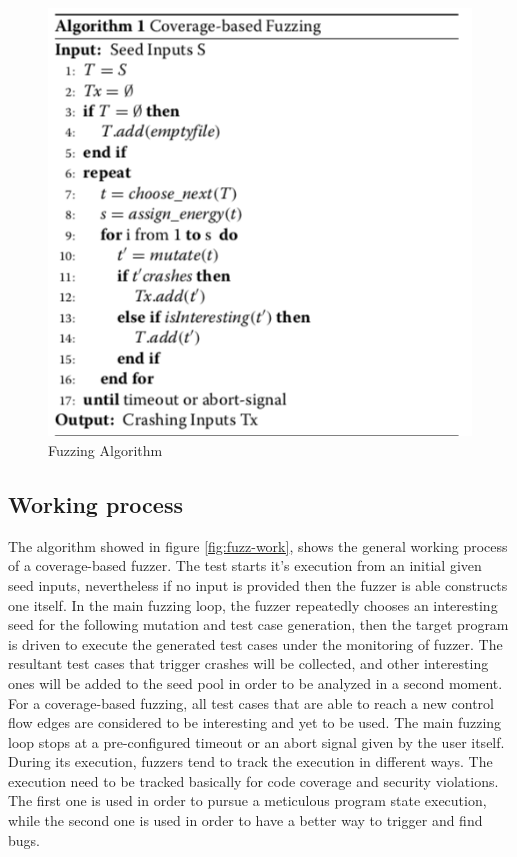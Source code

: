 \begin{figure}[tbh]
  \centering
  \includegraphics[width=0.7\linewidth]{images/Algo-fuzz.png}
  \caption[Fuzzing Algorithm]{Fuzzing Algorithm}
  \label{fig:Algo-fuzz}
\end{figure}

\subsection{Working process}

The algorithm showed in figure \ref{fig:fuzz-work}, shows the general working process of a coverage-based fuzzer. The test starts it's execution from an initial given seed inputs, 
nevertheless if no input is provided then the fuzzer is able constructs one itself. 
In the main fuzzing loop, the fuzzer repeatedly chooses an interesting seed for the following mutation and test case generation, then the target program is driven to execute the generated test cases under the monitoring of fuzzer.
The resultant test cases that trigger crashes will be collected, and other interesting ones will be added to the seed pool in order to be analyzed in a second moment. 
For a coverage-based fuzzing, all test cases that are able to reach a new control flow edges are considered to be interesting and yet to be used.
 The main fuzzing loop stops at a pre-configured timeout or an abort signal given by the user itself.
During its execution, fuzzers tend to track the execution in different ways. The execution need to be tracked basically for code coverage and security violations.
 The first one is used in order to pursue a meticulous program state execution, while the
second one is used in order to have a better way to trigger and find bugs.


